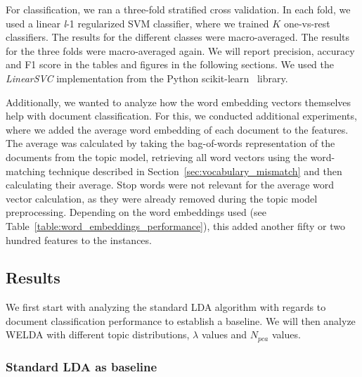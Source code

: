 \documentclass[
        a4paper,
        titlepage,
        twoside,
        parskip,
        numbers=noenddot
        ]{scrbook}
\theoremstyle{break}
\begin{document}
For classification, we ran a three-fold stratified cross validation.
In each fold, we used a linear \emph{l}-1 regularized SVM classifier, where we trained $K$ one-vs-rest classifiers.
The results for the different classes were macro-averaged.
The results for the three folds were macro-averaged again.
We will report precision, accuracy and F1 score in the tables and figures in the following sections.
We used the \emph{LinearSVC} implementation from the Python scikit-learn~\cite{Pedregosa2012} library.

Additionally, we wanted to analyze how the word embedding vectors themselves help with document classification.
For this, we conducted additional experiments, where we added the average word embedding of each document to the features.
The average was calculated by taking the bag-of-words representation of the documents from the topic model, retrieving all word vectors using the word-matching technique described in Section~\ref{sec:vocabulary_mismatch} and then calculating their average.
Stop words were not relevant for the average word vector calculation, as they were already removed during the topic model preprocessing.
Depending on the word embeddings used (see Table~\ref{table:word_embeddings_performance}), this added another fifty or two hundred features to the instances.

\subsection{Results}

We first start with analyzing the standard LDA algorithm with regards to document classification performance to establish a baseline.
We will then analyze WELDA with different topic distributions, $\lambda$ values and $N_{pca}$ values.

\subsubsection{Standard LDA as baseline}
\end{document}

